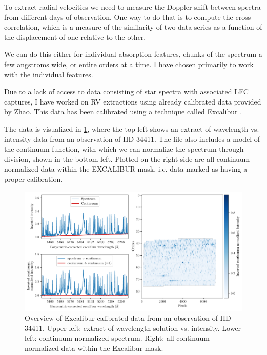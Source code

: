     To extract radial velocities we need to measure the Doppler shift between spectra from different days of observation. One way to do that is to compute the cross-correlation, which is a measure of the similarity of two data series as a function of the displacement of one relative to the other.
    
    We can do this either for individual absorption features, chunks of the spectrum a few angstroms wide, or entire orders at a time. I have chosen primarily to work with the individual features.

    Due to a lack of access to data consisting of star spectra with associated LFC captures, I have worked on RV extractions using already calibrated data provided by Zhao. This data has been calibrated using a technique called Excalibur \cite{zhao2021excalibur}.
    
    The data is visualized in \ref{fig:rv_data_overview}, where the top left shows an extract of wavelength vs. intensity data from an observation of HD 34411. The file also includes a model of the continuum function, with which we can normalize the spectrum through division, shown in the bottom left. Plotted on the right side are all continuum normalized data within the EXCALIBUR mask, i.e. data marked as having a proper calibration.

    \begin{figure}%
        \begin{wide}  
            \includegraphics[width=\textwidth]{figures/rv_data_overview.pdf}
            \caption{Overview of Excalibur calibrated data from an observation of HD 34411. Upper left: extract of wavelength solution vs. intensity. Lower left: continuum normalized spectrum. Right: all continuum normalized data within the Excalibur mask.}
            \label{fig:rv_data_overview}
        \end{wide}
    \end{figure}
            
